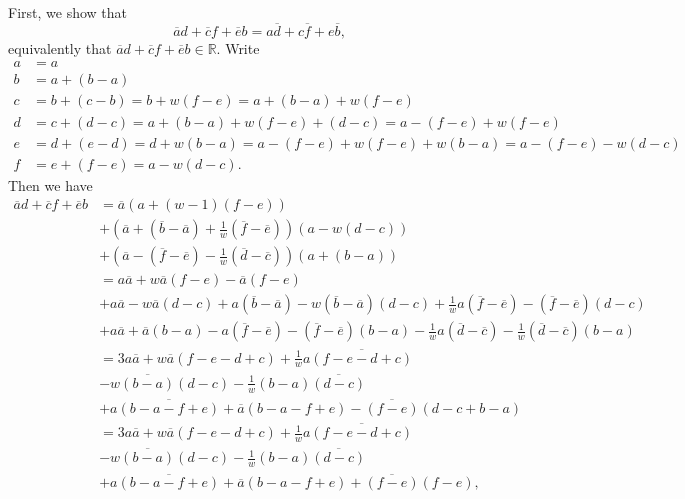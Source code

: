 First, we show that \[\overline{a}d+\overline{c}f+\overline{e}b=a\overline{d}+c\overline{f}+e\overline{b},\] equivalently that $\overline{a}d+\overline{c}f+\overline{e}b\in\mathbb{R}$. Write
\begin{align*}
	a&=a\\
	b&=a+\left(b-a\right)\\
	c&=b+\left(c-b\right)=b+w\left(f-e\right)=a+\left(b-a\right)+w\left(f-e\right)\\
	d&=c+\left(d-c\right)=a+\left(b-a\right)+w\left(f-e\right)+\left(d-c\right)=a-\left(f-e\right)+w\left(f-e\right)\\
	e&=d+\left(e-d\right)=d+w\left(b-a\right)=a-\left(f-e\right)+w\left(f-e\right)+w\left(b-a\right)=a-\left(f-e\right)-w\left(d-c\right)\\
	f&=e+\left(f-e\right)=a-w\left(d-c\right).
\end{align*}
Then we have
\begin{align*}
	\overline{a}d+\overline{c}f+\overline{e}b&=\overline{a}\left(a+\left(w-1\right)\left(f-e\right)\right)\\&+\left(\overline{a}+\left(\overline{b}-\overline{a}\right)+\frac{1}{w}\left(\overline{f}-\overline{e}\right)\right)\left(a-w\left(d-c\right)\right)\\&+\left(\overline{a}-\left(\overline{f}-\overline{e}\right)-\frac{1}{w}\left(\overline{d}-\overline{c}\right)\right)\left(a+\left(b-a\right)\right)\\
	&=a\overline{a}+w\overline{a}\left(f-e\right)-\overline{a}\left(f-e\right)\\&+a\overline{a}-w\overline{a}\left(d-c\right)+a\left(\overline{b}-\overline{a}\right)-w\left(\overline{b}-\overline{a}\right)\left(d-c\right)+\frac{1}{w}a\left(\overline{f}-\overline{e}\right)-\left(\overline{f}-\overline{e}\right)\left(d-c\right)\\&+a\overline{a}+\overline{a}\left(b-a\right)-a\left(\overline{f}-\overline{e}\right)-\left(\overline{f}-\overline{e}\right)\left(b-a\right)-\frac{1}{w}a\left(\overline{d}-\overline{c}\right)-\frac{1}{w}\left(\overline{d}-\overline{c}\right)\left(b-a\right)\\
	&=3a\overline{a}+w\overline{a}\left(f-e-d+c\right)+\frac{1}{w}a\overline{\left(f-e-d+c\right)}\\&-w\overline{\left(b-a\right)}\left(d-c\right)-\frac{1}{w}\left(b-a\right)\overline{\left(d-c\right)}\\&+a\overline{\left(b-a-f+e\right)}+\overline{a}\left(b-a-f+e\right)-\overline{\left(f-e\right)}\left(d-c+b-a\right)\\
	&=3a\overline{a}+w\overline{a}\left(f-e-d+c\right)+\frac{1}{w}a\overline{\left(f-e-d+c\right)}\\&-w\overline{\left(b-a\right)}\left(d-c\right)-\frac{1}{w}\left(b-a\right)\overline{\left(d-c\right)}\\&+a\overline{\left(b-a-f+e\right)}+\overline{a}\left(b-a-f+e\right)+\overline{\left(f-e\right)}\left(f-e\right),
\end{align*}
